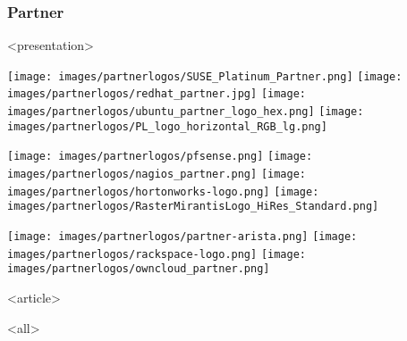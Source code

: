 \begin{frame}[fragile]
\frametitle<presentation>{Partner}




\mode
<presentation>


\begin{center}
		\texttt{[image: images/partnerlogos/SUSE\_Platinum\_Partner.png]}\hspace{0.7cm}
		\texttt{[image: images/partnerlogos/redhat\_partner.jpg]}\hspace{0.7cm}
		\texttt{[image: images/partnerlogos/ubuntu\_partner\_logo\_hex.png]}\hspace{0.7cm}
		\texttt{[image: images/partnerlogos/PL\_logo\_horizontal\_RGB\_lg.png]}\hspace{0.7cm}
\end{center}
                \vspace{0.1cm}
\begin{center}
		\texttt{[image: images/partnerlogos/pfsense.png]}\hspace{0.7cm}
		\texttt{[image: images/partnerlogos/nagios\_partner.png]}\hspace{0.7cm}
		\texttt{[image: images/partnerlogos/hortonworks-logo.png]}\hspace{0.7cm}
		\texttt{[image: images/partnerlogos/RasterMirantisLogo\_HiRes\_Standard.png]}\hspace{0.7cm}
		\end{center}
                \vspace{0.1cm}

\begin{center}
                \texttt{[image: images/partnerlogos/partner-arista.png]}\hspace{0.7cm}              
		\texttt{[image: images/partnerlogos/rackspace-logo.png]}\hspace{0.7cm}
                \texttt{[image: images/partnerlogos/owncloud\_partner.png]}\hspace{0.7cm}
		\end{center}

\mode
<article>

\mode
<all>

\end{frame}
\newpage
\clearpage

